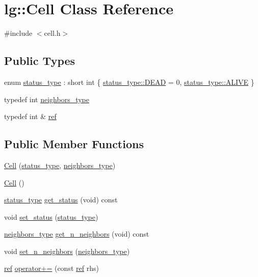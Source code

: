 \hypertarget{classlg_1_1Cell}{}\section{lg\+:\+:Cell Class Reference}
\label{classlg_1_1Cell}


{\ttfamily \#include $<$cell.\+h$>$}

\subsection*{Public Types}
\begin{DoxyCompactItemize}
\item 
enum \hyperlink{classlg_1_1Cell_a10376a213d664b96708f0d1e6d512f20}{status\+\_\+type} \+: short int \{ \hyperlink{classlg_1_1Cell_a10376a213d664b96708f0d1e6d512f20abb4784231ff45108ee20bad16e4a2e8c}{status\+\_\+type\+::\+D\+E\+AD} = 0, 
\hyperlink{classlg_1_1Cell_a10376a213d664b96708f0d1e6d512f20a3bfa0eed9e858c516e816a519b2a82eb}{status\+\_\+type\+::\+A\+L\+I\+VE}
 \}
\item 
typedef int \hyperlink{classlg_1_1Cell_aa88691e430082878fa8092c25865ab53}{neighbors\+\_\+type}
\item 
typedef int \& \hyperlink{classlg_1_1Cell_a6b1da298dc7e18f248793dad5a08942a}{ref}
\end{DoxyCompactItemize}
\subsection*{Public Member Functions}
\begin{DoxyCompactItemize}
\item 
\hyperlink{classlg_1_1Cell_a83ad0d1ad0c41568dd1ca705fd9e6d79}{Cell} (\hyperlink{classlg_1_1Cell_a10376a213d664b96708f0d1e6d512f20}{status\+\_\+type}, \hyperlink{classlg_1_1Cell_aa88691e430082878fa8092c25865ab53}{neighbors\+\_\+type})
\item 
\hyperlink{classlg_1_1Cell_a7f0e924b0e4ce962e672fef3cc19845e}{Cell} ()
\item 
\hyperlink{classlg_1_1Cell_a10376a213d664b96708f0d1e6d512f20}{status\+\_\+type} \hyperlink{classlg_1_1Cell_a987774f15b2ea5dbdd1660d90e3a3a9b}{get\+\_\+status} (void) const 
\item 
void \hyperlink{classlg_1_1Cell_a6189b8c4b586f23af49268f18728b767}{set\+\_\+status} (\hyperlink{classlg_1_1Cell_a10376a213d664b96708f0d1e6d512f20}{status\+\_\+type})
\item 
\hyperlink{classlg_1_1Cell_aa88691e430082878fa8092c25865ab53}{neighbors\+\_\+type} \hyperlink{classlg_1_1Cell_ae612dac1ca0c6f35849f4467961c9511}{get\+\_\+n\+\_\+neighbors} (void) const 
\item 
void \hyperlink{classlg_1_1Cell_a88953b9e1c8f464604b2f80883d1117c}{set\+\_\+n\+\_\+neighbors} (\hyperlink{classlg_1_1Cell_aa88691e430082878fa8092c25865ab53}{neighbors\+\_\+type})
\item 
\hyperlink{classlg_1_1Cell_a6b1da298dc7e18f248793dad5a08942a}{ref} \hyperlink{classlg_1_1Cell_a1e8a1a70c7d371ab205d32f6cde254da}{operator+=} (const \hyperlink{classlg_1_1Cell_a6b1da298dc7e18f248793dad5a08942a}{ref} rhs)
\end{DoxyCompactItemize}


